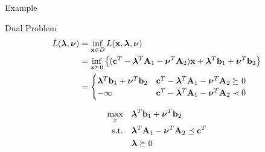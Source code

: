 \documentclass[12pt,notes,mathserif]{beamer}
\begin{document}
\begin{frame}
	{Example}
	\begin{block}{Dual Problem}
		\vspace{-1em}
		\begin{equation*}
			\begin{aligned}
				\tilde{L}(\boldsymbol{\lambda}, \boldsymbol{\nu} ) & = \inf_{\mathbf{x} \in D} L(\mathbf{x}, \boldsymbol{\lambda}, \boldsymbol{\nu}) \\
										 & = \inf_{\mathbf{x} \succeq 0} \left\{ (\mathbf{c}^T - \boldsymbol{\lambda}^T \mathbf{A}_1 - \boldsymbol{\nu}^T \mathbf{A}_2 ) \mathbf{x} + \boldsymbol{\lambda}^T \mathbf{b}_1 + \boldsymbol{\nu}^T \mathbf{b}_2 \right\}    \\ 
										 & = \begin{cases} 
											\boldsymbol{\lambda}^T \mathbf{b}_1 + \boldsymbol{\nu}^T \mathbf{b}_2 & \mathbf{c}^T - \boldsymbol{\lambda}^T \mathbf{A}_1 - \boldsymbol{\nu}^T \mathbf{A}_2 \succeq 0 \\
											-\infty & \mathbf{c}^T - \boldsymbol{\lambda}^T \mathbf{A}_1 - \boldsymbol{\nu}^T \mathbf{A}_2 \prec 0 \\
										\end{cases}  \\
			\end{aligned}
		\end{equation*}
		
		\begin{equation}
			\begin{aligned}
				\max_x \quad        &\boldsymbol{\lambda}^T \mathbf{b}_1 + \boldsymbol{\nu}^T \mathbf{b}_2         \\
				\textrm{s.t.} \quad &  \boldsymbol{\lambda}^T \mathbf{A}_1 - \boldsymbol{\nu}^T \mathbf{A}_2 \preceq \mathbf{c}^T  \\
				                    & \boldsymbol{\lambda} \succeq 0       \\
			\end{aligned}
		\end{equation}

	\end{block}
\end{frame}
\end{document}
